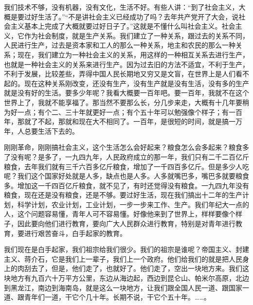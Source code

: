 我们技术不够，没有机器，没有文化，生活不好。有些人讲：“到了社会主义，大概是要过好生活了。”“不是讲社会主义已经成功了吗？去年共产党开了大会，说社会主义基本上完成了大概就要过好日子了。”这就是不懂什么叫社会主义。社会主义，它作为社会制度，就是生产关系。我们建立了一种关系，跟过去的关系不同，人民进行生产，过去是资本家和工人的那么一种关系，地主和农民的那么一种关系；现在，我们建立为一种社会主义的关系，用这样的一种相互关系去进行生产，也就是一种社会主义的关系来进行生产。因为过去旧的方法不适宜，不利于生产，不利于发展，比较差些，弄得中国人民长期地又穷又是文盲，在世界上是人们看不起的。现在这种关系刚改变，还没有生产，没有生产就是没有生活，没有多的生产就是没有好的生活。要多少年呢？我看大概要一百年吧。要一百年，我就不在这个世界上了，我就不能享福了。那当然不要那么长，分几步来走，大概有十几年要稍为好一点；有个二、三十年就更好一点；有个五十年可以勉强像个样子；有一百年，那就了不起，那就和现在大不相同了。一百年，是很短的时间，就是搞一万年，人总要生活下去的。

刚刚革命，刚刚搞社会主义，这个生活怎么会好起来？粮食怎么会多起来？粮食多了没有呢？是多了，一九四九年，人民政府成立的那一年，我们只有二千二百亿斤粮食，去年我们就有三千六百多亿斤粮食，增加了一千四百多亿斤。但是多少人吃呢？我们这个国家好处就是人多，缺点也是人多。人多就嘴巴多，嘴巴多就要粮食多。增加这一千四百亿斤粮食，就不见了，有时还觉得没有粮食。一九四九年没有粮食，现在还是没有粮食，还是不够。要过好生活，现在我们搞出十二年的生产计划，科学计划，农业计划，工业计划，一步一步来工作、生产。我们年纪大一点的人，这个问题容易懂，青年人可不容易懂。好像他来到了世界上，样样要像个样子，因此要向他们进行教育，要向广大人民群众进行教育，特别是对青年进行教育，要进行艰苦奋斗，白手起家的教育。

我们现在是白手起家，我们祖宗给我们很少。我们的祖宗是谁呢？帝国主义、封建主义、蒋介石，它是我们上一辈子，我们上一个政府。他们给我们的就是把人民身上的肉刮去了，但是，他们走了，也就好了。他们走了，空出一块地方来。我们这块地方有九百六十万平方公里，东边从海边起，西边到昆仑山、帕米尔高原，北边到黑龙江，南边到海南岛，就是这么一块地方，让我们跟全国人民一道、跟国家一道、跟青年们一道，干它个几十年。长期不说，干它个五十年。……。

